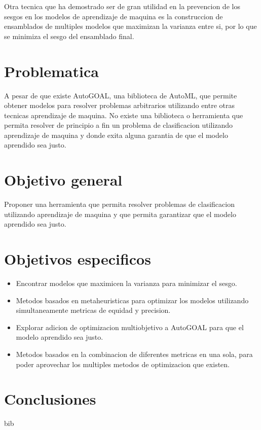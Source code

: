 \documentclass[runningheads,a4paper]{llncs}
\begin{document}
Otra tecnica que ha demostrado ser de gran utilidad en la prevencion de los sesgos en los modelos de aprendizaje de maquina es la construccion de ensamblados de multiples modelos que maximizan la varianza entre si, por lo que se minimiza el sesgo del ensamblado final.

\section*{Problematica}

A pesar de que existe AutoGOAL, una biblioteca de AutoML, que permite obtener modelos para resolver problemas arbitrarios utilizando entre otras tecnicas aprendizaje de maquina. No existe una biblioteca o herramienta que permita resolver de principio a fin un problema de clasificacion utilizando aprendizaje de maquina y donde exita alguna garantia de que el modelo aprendido sea justo.

\section*{Objetivo general}

Proponer una herramienta que permita resolver problemas de clasificacion utilizando aprendizaje de maquina y que permita garantizar que el modelo aprendido sea justo.

\section*{Objetivos especificos}

\begin{itemize}
	\item Encontrar modelos que maximicen la varianza para minimizar el sesgo.
	\item Metodos basados en metaheuristicas para optimizar los modelos utilizando simultaneamente metricas de equidad y precision.
	\item Explorar adicion de optimizacion multiobjetivo a AutoGOAL para que el modelo aprendido sea justo.
	\item Metodos basados en la combinacion de diferentes metricas en una sola, para poder aprovechar los multiples metodos de optimizacion que existen.
\end{itemize}

\section*{Conclusiones}


\begin{thebibliography}{4}
	
	 bib
	
\end{thebibliography}
\end{document}
